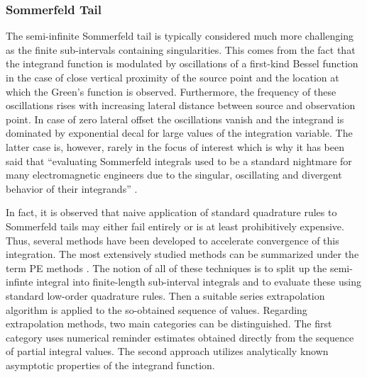 \subsubsection{Sommerfeld Tail}

The semi-infinite Sommerfeld tail is typically considered much more challenging
as the finite sub-intervals containing singularities.
This comes from the fact that the integrand function is modulated by
oscillations of a first-kind Bessel function in the case of close vertical
proximity of the source point and the location at which the Green's function
is observed.
Furthermore, the frequency of these oscillations rises with increasing lateral 
distance between source and observation point.
In case of zero lateral offset the oscillations vanish and the integrand
is dominated by exponential decal for large values of the integration variable.
The latter case is, however, rarely in the focus of interest which is why
it has been said that \enquote{evaluating Sommerfeld integrals used to be a
standard nightmare for many electromagnetic engineers due to the singular,
oscillating and divergent behavior of their integrands} \cite{jimenez1996}.


In fact, it is observed that naive application of standard quadrature rules to
Sommerfeld tails may either fail entirely or is at least prohibitively
expensive.
Thus, several methods have been developed to accelerate convergence of this 
integration.
The most extensively studied methods can be summarized under the term 
\ac{PE} methods \cite{Michalski1998}.
The notion of all of these techniques is to split up the semi-infinte integral
into finite-length sub-interval integrals and to evaluate these using standard
low-order quadrature rules.
Then a suitable series extrapolation algorithm \cite{brezinski2013} is applied
to the so-obtained sequence of values.
Regarding extrapolation methods, two main categories can be distinguished.
The first category uses numerical reminder estimates obtained directly from
the sequence of partial integral values.
The second approach utilizes analytically known asymptotic properties of the 
integrand function.

